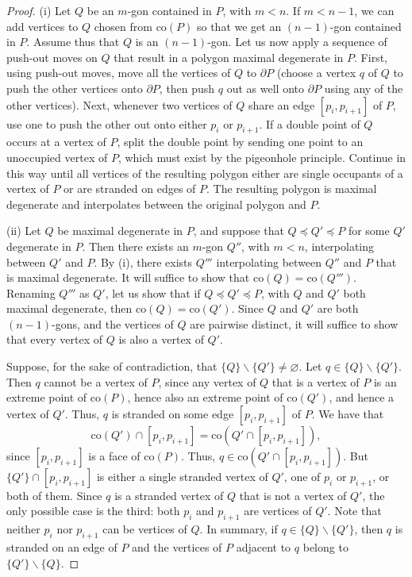 \documentclass[11pt]{amsart}
\theoremstyle{remark}
\numberwithin{equation}{section}
\newcommand{\co}{\mathrm{co}}
\renewcommand{\precsim}{\preccurlyeq}
\begin{document}
\begin{proof}
(i) Let $Q$ be an  $m$-gon contained in $P$, with $m<n$. If $m<n-1$, we can add vertices 
to  $Q$  chosen from $\co(P)$ so  that we get an $(n-1)$-gon contained in $P$. Assume thus that $Q$ is an $(n-1)$-gon. Let us now apply a sequence of push-out
moves on $Q$ that result in a polygon maximal degenerate in $P$. First, using push-out moves, move all the vertices of $Q$ to $\partial P$ 
(choose a vertex $q$ of $Q$ to push the other vertices onto $\partial P$, then push $q$ out as well onto $\partial P$ using any of the other vertices). 
Next, whenever two vertices of $Q$ share an edge $[p_i, p_{i+1}]$ of $P$, use one to push the other out onto either $p_i$ or $p_{i+1}$.
If a double point of $Q$ occurs at a vertex of $P$, split the double point by sending one point to an unoccupied vertex of $P$, which must exist by the pigeonhole principle.
Continue in this way until all vertices of the resulting polygon either are single occupants of a vertex of $P$ or are stranded on edges of $P$. The resulting polygon  is maximal degenerate and interpolates between the original polygon and $P$.

(ii) Let $Q$ be maximal degenerate in $P$, and suppose that $Q\precsim Q'\precsim P$ for some $Q'$ degenerate in $P$. 
Then there exists an $m$-gon $Q''$, with $m<n$, interpolating between $Q'$ and $P$. By (i), there  exists  $Q'''$ interpolating between $Q''$ and $P$ that is maximal degenerate. It will suffice to  show that $\co(Q)=\co(Q''')$.
Renaming $Q'''$ as $Q'$, let us show that if $Q\precsim Q'\precsim P$, with $Q$ and $Q'$ both maximal degenerate, then $\co(Q)=\co(Q')$. Since $Q$ and $Q'$ are both $(n-1)$-gons, and the vertices of $Q$ are pairwise distinct, it will suffice to show that every vertex of $Q$ is also a vertex of $Q'$.



Suppose, for the sake of contradiction, that $\{Q\}\backslash \{Q'\}\neq \varnothing$. Let $q\in \{Q\}\backslash \{Q'\}$.  Then $q$ cannot be a vertex of $P$,  since  any vertex of $Q$ that is a vertex of $P$ is an extreme point of $\co(P)$,  hence also an extreme point of $\co(Q')$, and hence a vertex of $Q'$. Thus, $q$ is stranded on some edge $[p_i,p_{i+1}]$ of $P$.  We have that 
\[
\co(Q')\cap [p_i,p_{i+1}]=\co(Q'\cap [p_i,p_{i+1}]),
\] 
since $[p_i,p_{i+1}]$ is a face of $\co(P)$. Thus, $q\in  \co(Q'\cap [p_i,p_{i+1}])$. But  $\{Q'\}\cap [p_i,p_{i+1}]$ is either a single stranded vertex of $Q'$, one of $p_i$ or $p_{i+1}$, or both of them. Since  $q$ is a stranded vertex of $Q$ that is not a vertex of $Q'$, the only possible case is the third: both $p_i$ and $p_{i+1}$ are vertices of $Q'$.  Note that neither $p_i$ nor $p_{i+1}$ can be vertices of $Q$. In summary,  if $q\in \{Q\}\backslash \{Q'\}$, then $q$ is stranded on an edge of $P$ and the vertices of $P$ adjacent to  $q$ belong to $\{Q'\}\backslash \{Q\}$.


\end{proof}
\end{document}
